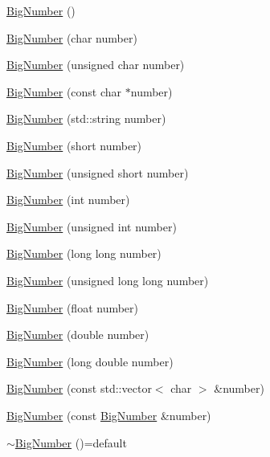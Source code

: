 \begin{DoxyCompactItemize}
\item 
\mbox{\hyperlink{class_big_nums_1_1_big_number_a1567531627c79b2018363684cec9ed34}{Big\+Number}} ()
\item 
\mbox{\hyperlink{class_big_nums_1_1_big_number_a10752ca000f0362291294fc9d96a17fb}{Big\+Number}} (char number)
\item 
\mbox{\hyperlink{class_big_nums_1_1_big_number_a20b7a7fe3497b4ff501360eb6a3f2975}{Big\+Number}} (unsigned char number)
\item 
\mbox{\hyperlink{class_big_nums_1_1_big_number_a05b1e09de1d6504fb0d17abe59e1567e}{Big\+Number}} (const char $\ast$number)
\item 
\mbox{\hyperlink{class_big_nums_1_1_big_number_a403ae18d7626dc619160b46b7d94e3d4}{Big\+Number}} (std\+::string number)
\item 
\mbox{\hyperlink{class_big_nums_1_1_big_number_a10c73e0ca7d565c7f50907d88e653fcc}{Big\+Number}} (short number)
\item 
\mbox{\hyperlink{class_big_nums_1_1_big_number_a7ffb48df9f893148c553a4ffba013bd5}{Big\+Number}} (unsigned short number)
\item 
\mbox{\hyperlink{class_big_nums_1_1_big_number_a1a48f0ab5c66b95b98fba8e40371be90}{Big\+Number}} (int number)
\item 
\mbox{\hyperlink{class_big_nums_1_1_big_number_ac9b6672f2bb3ef8da30635a83cc7d742}{Big\+Number}} (unsigned int number)
\item 
\mbox{\hyperlink{class_big_nums_1_1_big_number_a1e9851c75b436dfd943456c9f6fe7d5f}{Big\+Number}} (long long number)
\item 
\mbox{\hyperlink{class_big_nums_1_1_big_number_aff681535ca202ff247413e35e09388ad}{Big\+Number}} (unsigned long long number)
\item 
\mbox{\hyperlink{class_big_nums_1_1_big_number_afa8357b2be149b6f21f404e8cb95ebf2}{Big\+Number}} (float number)
\item 
\mbox{\hyperlink{class_big_nums_1_1_big_number_a2abf856e5d6fe96a174d6de3091580c5}{Big\+Number}} (double number)
\item 
\mbox{\hyperlink{class_big_nums_1_1_big_number_aeb155e4d45721f93a813dc2dacacc914}{Big\+Number}} (long double number)
\item 
\mbox{\hyperlink{class_big_nums_1_1_big_number_a02539ef464467b437b133dff855e67f0}{Big\+Number}} (const std\+::vector$<$ char $>$ \&number)
\item 
\mbox{\hyperlink{class_big_nums_1_1_big_number_a3a065889297357cb69da1f503f017a27}{Big\+Number}} (const \mbox{\hyperlink{class_big_nums_1_1_big_number}{Big\+Number}} \&number)
\item 
\mbox{\hyperlink{class_big_nums_1_1_big_number_a09e060fefa8279c48d5a5f12fde8c802}{$\sim$\+Big\+Number}} ()=default
\end{DoxyCompactItemize}

